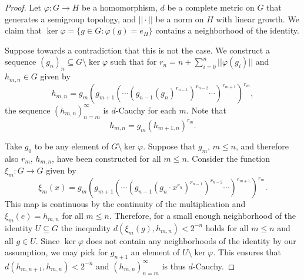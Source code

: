 \documentclass[12pt]{paper}
\numberwithin{equation}{section}
\theoremstyle{plain}
\theoremstyle{definition}
\newcommand{\norm}[1]{||#1||}
\renewcommand{\phi}{\varphi}
\begin{document}
\begin{proof}
  Let \(\phi : G \to H\) be a homomorphism, \(d\) be a complete metric on \(G\) that generates a
  semigroup topology, and \(\norm{\cdot}\) be a norm on \(H\) with linear growth.  We claim that
  \(\ker \phi = \{g \in G : \phi(g) = e_H\}\) contains a neighborhood of the identity.

  Suppose towards a contradiction that this is not the case.  We construct a sequence
  \((g_{n})_{n} \subseteq G \setminus \ker \phi\) such that for
  \(r_{n} = n + \sum_{i=0}^{n}\norm{\phi(g_{i})}\) and \(h_{m,n} \in G\) given by
  \[h_{m,n} = g_{m}(g_{m+1}(\cdots (g_{n-1}(g_{n})^{r_{n-1}})^{r_{n-2}}\cdots
    )^{r_{m+1}})^{r_{m}},\]
  the sequence \((h_{m,n})_{n=m}^{\infty}\) is \(d\)-Cauchy for each \(m\).  Note that
  \begin{equation}
    \label{eq:hnm-relation}
    h_{m,n} = g_{m}(h_{m+1,n})^{r_{m}}.
  \end{equation}

  Take \(g_{0}\) to be any element of \(G \setminus \ker \phi\).  Suppose that \(g_{m}\),
  \(m \le n\), and therefore also \(r_{m}\), \(h_{m,n}\), have been constructed for all \(m \le n\).
  Consider the function \(\xi_{m} : G \to G\) given by
  \[\xi_{m}(x) = g_{m}(g_{m+1}(\cdots (g_{n-1}(g_{n} \cdot x^{r_{n}})^{r_{n-1}})^{r_{n-2}}\cdots
    )^{r_{m+1}})^{r_{m}}.\]
  This map is continuous by the continuity of the multiplication and \(\xi_{m}(e) = h_{m,n}\) for
  all \(m \le n\).  Therefore, for a small enough neighborhood of the identity \(U \subseteq G\) the
  inequality \(d(\xi_{m}(g), h_{m,n}) < 2^{-n}\) holds for all \(m \le n\) and all \(g \in U\).
  Since \(\ker \phi\) does not contain any neighborhoods of the identity by our assumption, we may
  pick for \(g_{n+1}\) an element of \(U \setminus \ker \phi\).  This ensures that
  \(d(h_{m,n+1}, h_{m,n}) < 2^{-n}\) and \((h_{m,n})_{n=m}^{\infty}\) is thus \(d\)-Cauchy.


\end{proof}
\end{document}
